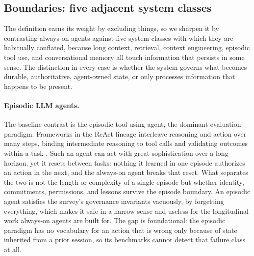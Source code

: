 \subsection{Boundaries: five adjacent system classes}\label{subsec:boundaries}

The definition earns its weight by excluding things, so we sharpen it by contrasting always-on agents against five system classes with which they are habitually conflated, because long context, retrieval, context engineering, episodic tool use, and conversational memory all touch information that persists in some sense. The distinction in every case is whether the system governs what becomes durable, authoritative, agent-owned state, or only processes information that happens to be present.

\paragraph{Episodic LLM agents.} The baseline contrast is the episodic tool-using agent, the dominant evaluation paradigm. Frameworks in the ReAct lineage interleave reasoning and action over many steps, binding intermediate reasoning to tool calls and validating outcomes within a task \citep{yao2023reactsynergizingreasoningacting}. Such an agent can act with great sophistication over a long horizon, yet it resets between tasks: nothing it learned in one episode authorizes an action in the next, and the always-on agent breaks that reset. What separates the two is not the length or complexity of a single episode but whether identity, commitments, permissions, and lessons survive the episode boundary. An episodic agent satisfies the survey's governance invariants vacuously, by forgetting everything, which makes it safe in a narrow sense and useless for the longitudinal work always-on agents are built for. The gap is foundational: the episodic paradigm has no vocabulary for an action that is wrong only because of state inherited from a prior session, so its benchmarks cannot detect that failure class at all.

